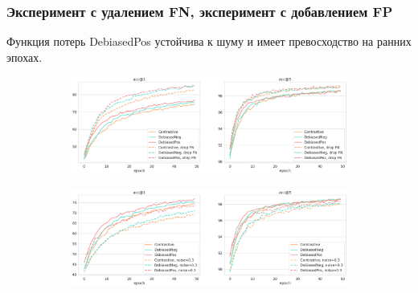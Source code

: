 \documentclass[
	11pt, %
	t, %
        russian
]{beamer}
\begin{document}
\begin{frame}
    \frametitle{\small Эксперимент с удалением FN, эксперимент с добавлением FP}

\scriptsize
Функция потерь DebiasedPos устойчива к шуму и имеет превосходство на ранних эпохах.

\begin{figure}
\centering
\begin{subfigure}
  \centering
  \includegraphics[width=0.85\linewidth]{Images/base_vs_dropfn.png}
  \label{fig:sub1}
\end{subfigure}%

\begin{subfigure}
  \centering
  \hspace*{+0.22cm}\includegraphics[width=0.85\linewidth]{Images/base_vs_noise.png}
  \label{fig:sub2}
\end{subfigure}
\label{fig:test}
\end{figure}


	
\end{frame}
\end{document}
